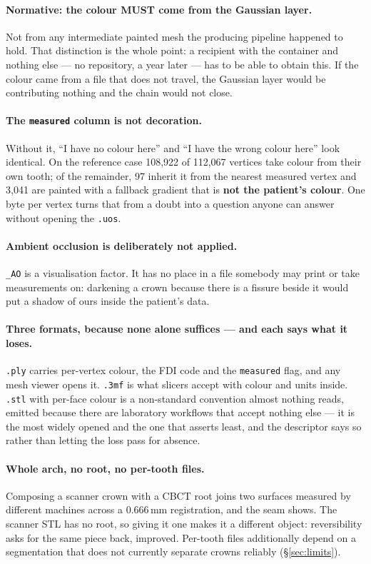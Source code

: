\documentclass[11pt,a4paper]{article}
\newcommand{\MUST}{\textcolor{uosred}{\textbf{MUST}}}
\newcommand{\code}[1]{\texttt{\small #1}}
\begin{document}
\paragraph{Normative: the colour \MUST{} come from the Gaussian layer.} Not from any
intermediate painted mesh the producing pipeline happened to hold. That distinction is the
whole point: a recipient with the container and nothing else --- no repository, a year later
--- has to be able to obtain this. If the colour came from a file that does not travel, the
Gaussian layer would be contributing nothing and the chain would not close.

\paragraph{The \code{measured} column is not decoration.} Without it, ``I have no colour
here'' and ``I have the wrong colour here'' look identical. On the reference case
108{,}922 of 112{,}067 vertices take colour from their own tooth; of the remainder, 97
inherit it from the nearest measured vertex and 3{,}041 are painted with a fallback
gradient that is \textbf{not the patient's colour}. One byte per vertex turns that from a
doubt into a question anyone can answer without opening the \code{.uos}.

\paragraph{Ambient occlusion is deliberately not applied.} \code{\_AO} is a visualisation
factor. It has no place in a file somebody may print or take measurements on: darkening a
crown because there is a fissure beside it would put a shadow of ours inside the patient's
data.

\paragraph{Three formats, because none alone suffices --- and each says what it loses.}
\code{.ply} carries per-vertex colour, the FDI code and the \code{measured} flag, and any
mesh viewer opens it. \code{.3mf} is what slicers accept with colour and units inside.
\code{.stl} with per-face colour is a non-standard convention almost nothing reads, emitted
because there are laboratory workflows that accept nothing else --- it is the most widely
opened and the one that asserts least, and the descriptor says so rather than letting the
loss pass for absence.

\paragraph{Whole arch, no root, no per-tooth files.} Composing a scanner crown with a CBCT
root joins two surfaces measured by different machines across a 0.666\,mm registration, and
the seam shows. The scanner STL has no root, so giving it one makes it a different object:
reversibility asks for the same piece back, improved. Per-tooth files additionally depend on
a segmentation that does not currently separate crowns reliably (\S\ref{sec:limits}).
\end{document}
